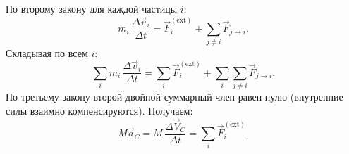 \documentclass[12pt, a4paper]{article}%
\begin{document}
По второму закону для каждой частицы \(i\):  
\[
m_i\,\frac{\Delta\vec v_i}{\Delta t}
= \vec F_i^{\mathrm{(ext)}} + \sum_{j\ne i}\vec F_{j\to i}.
\]
Складывая по всем \(i\):
\[
\sum_i m_i\,\frac{\Delta\vec v_i}{\Delta t}
= \sum_i \vec F_i^{\mathrm{(ext)}} 
+ \sum_{i}\sum_{j\ne i}\vec F_{j\to i}.
\]
По третьему закону второй двойной суммарный член равен нулю (внутренние силы взаимно
компенсируются). Получаем:
\[
M\vec a_C = M\,\frac{\Delta\vec V_C}{\Delta t}
= \sum_i \vec F_i^{\mathrm{(ext)}}.
\]
\end{document}

